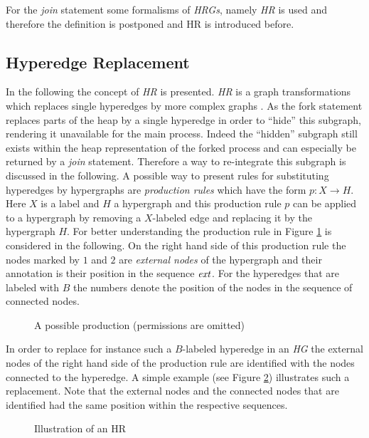 	For the \emph{join} statement some formalisms of \emph{\aclp*{HRG}}, namely
	\emph{\acl*{HR}} is used and therefore the definition is postponed and
	\acl*{HR} is introduced before.

\subsection{Hyperedge Replacement}
\label{sec:hyperedgereplacement}
	In the following the concept of \emph{\ac{HR}} is presented.
	\emph{\Ac{HR}} is a  graph transformations which replaces single hyperedges
	by more complex graphs \cite[p. 104]{HandbookGraphGrammars}. As the fork
	statement replaces parts of the heap by a single hyperedge in order to
	\enquote{hide} this subgraph, rendering it unavailable for the main process.
	Indeed the \enquote{hidden} subgraph still exists within the heap
	representation of the forked process and can especially be returned by a
	\emph{join} statement. Therefore a way to re-integrate this subgraph is
	discussed in the following. A possible way to present rules for substituting
	hyperedges by hypergraphs are \emph{production rules} which have the form
	$p\colon X\rightarrow H$. Here $X$ is a label and $H$ a hypergraph and this
	production rule $p$ can be applied to a hypergraph by removing a
	$X$-labeled edge and replacing it by the hypergraph $H$. For better
	understanding the production rule in Figure \ref{fig:productionrule} is
	considered in the following. On the right hand side of this production rule
	the nodes marked by $1$ and $2$ are \emph{external nodes} of the hypergraph
	and their annotation is their position in the sequence $\mathit{ext}$. For the
	hyperedges that are labeled with $B$ the numbers denote the position of the
	nodes in the sequence of connected nodes.
	\begin{figure}[ht!]
		\begin{center}
			
			\caption{A possible production (permissions are omitted)}
			\label{fig:productionrule}
		\end{center}
	\end{figure}
	In order to replace for instance such a $B$-labeled hyperedge in an
	\emph{\ac{HG}} the external nodes of the right hand side of the production
	rule are identified with the nodes connected to the hyperedge. A simple
	example (see Figure \ref{fig:replacement}) illustrates such a replacement.
	Note that the external nodes and the connected nodes that are identified
	had the same position within the respective sequences.
	\begin{figure}
		\begin{center}
			
			\caption{Illustration of an \acl{HR}}
			\label{fig:replacement}
		\end{center}
	\end{figure}
